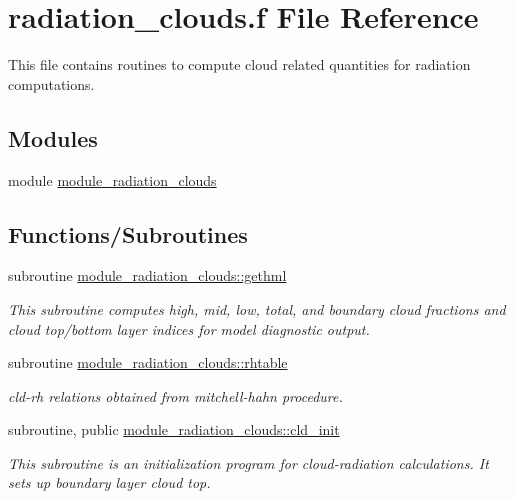 \hypertarget{radiation__clouds_8f}{}\section{radiation\+\_\+clouds.\+f File Reference}
\label{radiation__clouds_8f}


This file contains routines to compute cloud related quantities for radiation computations.  


\subsection*{Modules}
\begin{DoxyCompactItemize}
\item 
module \hyperlink{namespacemodule__radiation__clouds}{module\+\_\+radiation\+\_\+clouds}
\end{DoxyCompactItemize}
\subsection*{Functions/\+Subroutines}
\begin{DoxyCompactItemize}
\item 
subroutine \hyperlink{group__module__radiation__clouds_gade00b72417f507bb7b07bc58dad58a61}{module\+\_\+radiation\+\_\+clouds\+::gethml}
\begin{DoxyCompactList}\small\item\em This subroutine computes high, mid, low, total, and boundary cloud fractions and cloud top/bottom layer indices for model diagnostic output. \end{DoxyCompactList}\item 
subroutine \hyperlink{group__module__radiation__clouds_gaf2368d9f176e9ab76bd9bd7cd687f491}{module\+\_\+radiation\+\_\+clouds\+::rhtable}
\begin{DoxyCompactList}\small\item\em cld-\/rh relations obtained from mitchell-\/hahn procedure. \end{DoxyCompactList}\end{DoxyCompactItemize}
{\bf }\par
\begin{DoxyCompactItemize}
\item 
subroutine, public \hyperlink{group__module__radiation__clouds_ga026c2d6859be7119ee7ff11fe760dfcc}{module\+\_\+radiation\+\_\+clouds\+::cld\+\_\+init}
\begin{DoxyCompactList}\small\item\em This subroutine is an initialization program for cloud-\/radiation calculations. It sets up boundary layer cloud top. \end{DoxyCompactList}\end{DoxyCompactItemize}

